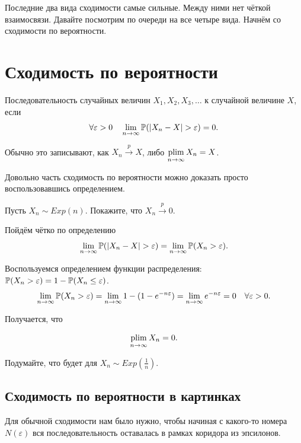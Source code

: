 \documentclass[12pt, a4paper, oneside]{article}
\begin{document}
Последние два вида сходимости самые сильные. Между ними нет чёткой взаимосвязи. Давайте посмотрим по очереди на все четыре вида. Начнём со сходимости по вероятности. 

\section{Сходимость по вероятности}

\begin{definition} 
Последовательность случайных величин $X_1, X_2, X_3, \ldots$  к случайной величине $X$, если 
\[
\forall \varepsilon > 0 \quad \lim_{n \to \infty} \mathbb{P}(|X_n - X| > \varepsilon) = 0.
\]

Обычно это записывают, как $X_n \overset{p}{\to} X$, либо $\operatorname*{plim}\limits_{n \to \infty} X_n = X$.
\end{definition} 

Довольно часть сходимость по вероятности можно доказать просто воспользовавшись определением.  

\begin{problem}{ } 
Пусть $X_n \sim Exp(n)$. Покажите, что $X_n \overset{p}{\to} 0$.
\end{problem} 

\begin{sol}
Пойдём чётко по определению
\[
\lim_{n \to \infty} \mathbb{P}(|X_n - X| > \varepsilon) = \lim_{n \to \infty} \mathbb{P}(X_n > \varepsilon).
\]

Воспользуемся определением функции распределения: $\mathbb{P}(X_n > \varepsilon) = 1 - \mathbb{P}(X_n \le \varepsilon)$.
\[
\lim_{n \to \infty} \mathbb{P}(X_n > \varepsilon) = \lim_{n \to \infty} 1 - (1 - e^{-n \varepsilon}) = \lim_{n \to \infty}  e^{-n \varepsilon} = 0 \quad \forall \varepsilon > 0.
\]

Получается, что 

\[
\operatorname*{plim}_{n \to \infty} X_n = 0.
\]

Подумайте, что будет для $X_n \sim Exp\left( \frac{1}{n} \right)$.
\end{sol}

\subsection{Сходимость по вероятности в картинках}

Для обычной сходимости нам было нужно, чтобы начиная с какого-то номера $N(\varepsilon)$ вся последовательность оставалась в рамках коридора из эпсилонов.  
\end{document}
